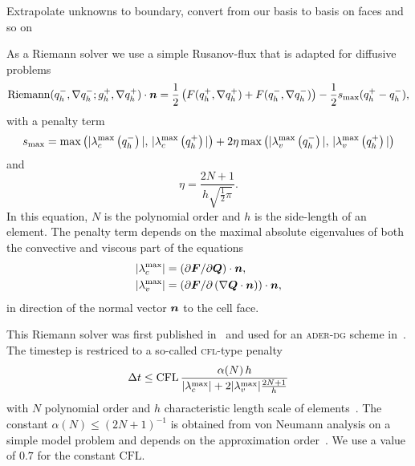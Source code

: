 Extrapolate unknowns to boundary, convert from our basis to basis on faces and so on

As a Riemann solver we use a simple Rusanov-flux that is adapted for diffusive problems
\begin{equation}
  \label{eq:rusanov-flux}
  \operatorname{Riemann}(q_h^-, \nabla q_h^-; g_h^+, \nabla q_h^+) \cdot \bm{n} =
  \frac{1}{2} \left(
    F(q_h^+, \nabla q_h^+) +
    F(q_h^-, \nabla q_h^-)
  \right) -
  \frac{1}{2} s_\text{max} (q_h^+ - q_h^-),
\end{equation}
with a penalty term
\begin{equation}
  \label{eq:parabolic-penalty}
  s_\text{max}  = \max \left(
\maxConvEigen[q_h^-], \, \maxConvEigen[q_h^+]
\right) +
2 \eta \max \left(
\maxViscEigen[q_h^-], \, \maxViscEigen[q_h^+]
\right)
\end{equation}
and
\begin{equation}
  \eta = \frac{2N+1}{h \sqrt{\frac{1}{2} \pi}}.
\end{equation}
In this equation, $N$ is the polynomial order and $h$ is the side-length of an element.
The penalty term depends on the maximal absolute eigenvalues of both the convective and viscous part of the equations
\begin{align}
  \begin{split}
    \maxConvEigen &= \left( \partial \bm{F}/\partial \bm{Q}\right) \cdot \normal,\\
    \maxViscEigen &= \left( \partial \bm{F}/\partial \left( \nabla \bm{Q} \cdot \normal \right)\right) \cdot \normal,
  \end{split}
\end{align}
in direction of the normal vector $\bm{n}$ to the cell face. 

This Riemann solver was first published in~\cite{gassner2008discontinuous} and used for an \textsc{ader-dg} scheme in~\cite{dumbser2010arbitrary}.
The timestep is restriced to a so-called \textsc{cfl}-type penalty
\begin{equation}\label{eq:cfl-aderdg}
 \Delta t \leq  \text{CFL} \, \frac{\alpha(N) \, h}{\maxConvEigen + 2 \maxViscEigen \frac{2N+1}{h}}
\end{equation}
with $N$ polynomial order and $h$ characteristic length scale of elements~\cite{dumbser2010arbitrary,gassner2008discontinuous}.
The constant $\alpha(N) \leq {\left( 2N+1  \right)}^{-1}$ is obtained from von Neumann analysis on a simple model problem and depends on the approximation order~\cite{dumbser2008unified}.
We use a value of $0.7$ for the constant $\text{CFL}$.

